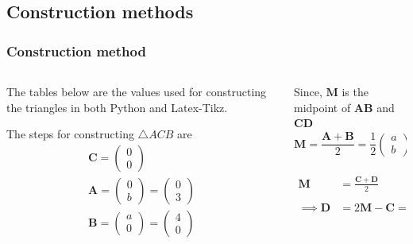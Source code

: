 \documentclass{beamer}
\theoremstyle{remark}
\newcommand{\myvec}[1]{\ensuremath{\begin{pmatrix}#1\end{pmatrix}}}
\let\vec\mathbf
\numberwithin{equation}{section}
\begin{document}
\subsection{Construction methods}
\begin{frame}[fragile]
\footnotesize
\frametitle{Construction method}
\begin{columns}
\begin{column}{0.5\textwidth}
The tables below are the values used for constructing the triangles in both Python and Latex-Tikz.
\begin{table}[htbp]
\centering
\caption{\footnotesize To construct $\triangle ACB$}
\end{table}
The steps for constructing $\triangle ACB$ are
\newline
\begin{align}
\label{eq:constr_c}
\vec{C}= \myvec{0\\0}
\\
\label{eq:constr_a}
\vec{A}=\myvec{0\\b}=\myvec{0\\3}
\\
\label{eq:constr_b}
\vec{B}=\myvec{a\\0}=\myvec{4\\0}
\end{align}
\end{column}
\begin{column}{0.5\textwidth}
Since, $\vec{M}$ is the midpoint of $\vec{AB}$ and $\vec{CD}$
\\
$$\vec{M}=\frac{\vec{A}+\vec{B}}{2}=\frac{1}{2}\myvec{a\\b}
\vec{M}=\myvec{2\\1.5}$$
\\
\begin{align}
\vec{M}&= \frac{\vec{C}+\vec{D}}{2}
\\
\label{eq:constr_d}
\implies \vec{D} &= 2 \vec{M} - \vec{C} = \myvec{a\\b}

\end{align}
\end{column}
\end{columns}
\end{frame}
\end{document}

